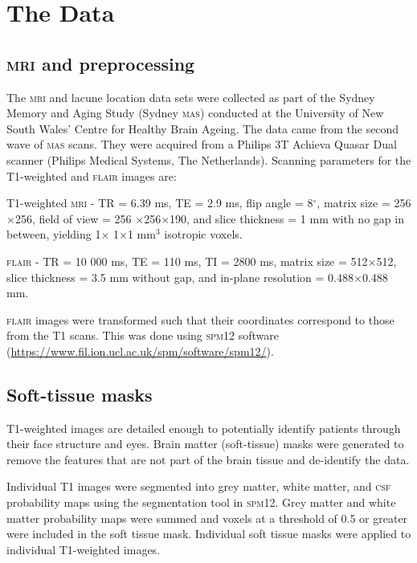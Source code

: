 


\chapter{The Data}\label{model}

\section{\textsc{mri} and preprocessing}\label{data-mri}

The \textsc{mri} and lacune location data sets were collected as part of the Sydney Memory and Aging Study (Sydney \textsc{mas}) conducted at the University of New South Wales' Centre for Healthy Brain Ageing. The data came from the second wave of \textsc{mas} scans. They were acquired from a Philips 3T Achieva Quasar Dual scanner (Philips Medical Systems, The Netherlands). Scanning parameters for the T1-weighted and \textsc{flair} images are:

T1-weighted \textsc{mri} - TR = 6.39 ms, TE = 2.9 ms, flip angle = 8$^\circ$, matrix size = 256$\times$256, field of view = 256 $\times$256$\times$190, and slice thickness = 1 mm with no gap in between, yielding 1$\times$ 1$\times$1 mm$^3$ isotropic voxels.

\textsc{flair} - TR = 10 000 ms, TE = 110 ms, TI = 2800 ms, matrix size = 512$\times$512, slice thickness = 3.5 mm without gap, and in-plane resolution = 0.488$\times$0.488 mm.

\textsc{flair} images were transformed such that their coordinates correspond to those from the T1 scans. This was done using \textsc{spm12} software (\url{https://www.fil.ion.ucl.ac.uk/spm/software/spm12/}).

\section{Soft-tissue masks}\label{data-soft}

T1-weighted images are detailed enough to potentially identify patients through their face structure and eyes. Brain matter (soft-tissue) masks were generated to remove the features that are not part of the brain tissue and de-identify the data.

Individual T1 images were segmented into grey matter, white matter, and \textsc{csf} probability maps using the segmentation tool in \textsc{spm12}. Grey matter and white matter probability maps were summed and voxels at a threshold of 0.5 or greater were included in the soft tissue mask. Individual soft tissue masks were applied to individual T1-weighted images.

